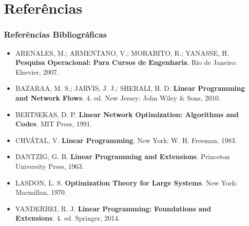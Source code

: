 \documentclass[aspectratio=169]{beamer}
\begin{document}
    
    
    
    
    
    \section{Referências}
    \begin{frame}
        \frametitle{Referências Bibliográficas}
        \footnotesize
        \begin{itemize}
            \item ARENALES, M.; ARMENTANO, V.; MORABITO, R.; YANASSE, H. \textbf{Pesquisa Operacional: Para Cursos de Engenharia}. Rio de Janeiro: Elsevier, 2007.   
            \item BAZARAA, M. S.; JARVIS, J. J.; SHERALI, H. D. \textbf{Linear Programming and Network Flows}. 4. ed. New Jersey: John Wiley \& Sons, 2010.
            \item BERTSEKAS, D. P. \textbf{Linear Network Optimization: Algorithms and Codes}. MIT Press, 1991.
            \item CHVÁTAL, V. \textbf{Linear Programming}. New York: W. H. Freeman, 1983.
            \item DANTZIG, G. B. \textbf{Linear Programming and Extensions}. Princeton University Press, 1963.
            \item LASDON, L. S. \textbf{Optimization Theory for Large Systems}. New York: Macmillan, 1970.
            \item VANDERBEI, R. J. \textbf{Linear Programming: Foundations and Extensions}. 4. ed. Springer, 2014.
        \end{itemize}
    \end{frame}
\end{document}
